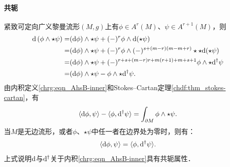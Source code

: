 \paragraph{共轭}	紧致可定向广义黎曼流形$(M,g)$上有$\phi\in A^r(M)$、$\psi\in A^{r+1}(M)$，则
\begin{align*}
	{\rm d} \left(\phi \wedge \star \psi\right) = & ({\rm d} \phi)\wedge \star \psi + (-)^r \phi \wedge {\rm d}(\star \psi) \\
	= & ({\rm d} \phi)\wedge \star \psi + (-)^{r} \phi \wedge (-)^{s+(m-r)(m-m+r)}\star \star{\rm d}(\star \psi) \\
	= & ({\rm d} \phi)\wedge \star \psi + (-)^{r+s+(m-r)r+m(r+1)+m+s+1} \phi \wedge \star {\rm d}^{\dagger} \psi \\
	= & ({\rm d} \phi)\wedge \star \psi - \phi \wedge \star {\rm d}^{\dagger} \psi .
\end{align*}
由内积定义\eqref{chrg:eqn_AhsB-inner}和Stokes--Cartan定理\ref{chdf:thm_stokes-cartan}，有
\begin{align}
	\langle {\rm d} \phi , \psi \rangle - \langle \phi , {\rm d}^{\dagger} \psi \rangle 
	= \int_{\partial M} \phi \wedge \star \psi .
\end{align}
当$M$是无边流形，或者$\phi$、$\star \psi$中任一者在边界处为零时，则有：
\begin{align}
	\langle {\rm d} \phi , \psi \rangle = \langle \phi , {\rm d}^{\dagger} \psi \rangle .
\end{align}
上式说明${\rm d}$与${\rm d}^{\dagger}$关于内积\eqref{chrg:eqn_AhsB-inner}具有共轭属性．



